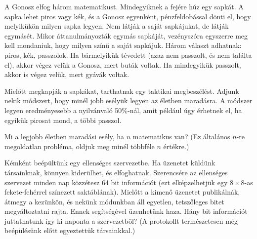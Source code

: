 \begin{Exercise}[counter={sorszam}, difficulty=0]
A Gonosz elfog három matematikust. Mindegyiknek a fejére húz egy sapkát. A sapka lehet piros vagy kék, és a Gonosz egyenként, pénzfeldobással dönti el, hogy melyikükön milyen sapka legyen. Nem látják a saját sapkájukat, de látják egymásét. Mikor áttanulmányozták egymás sapkáját, vezényszóra egyszerre meg kell mondaniuk, hogy milyen színű a saját sapkájuk. Három választ adhatnak: piros, kék, passzolok. Ha bármelyikük tévedett (azaz nem passzolt, és nem találta el), akkor végez velük a Gonosz, mert buták voltak. Ha mindegyikük passzolt, akkor is végez velük, mert gyávák voltak.

Mielőtt megkapják a sapkákat, tarthatnak egy taktikai megbeszélést. Adjunk nekik módszert, hogy minél jobb esélyük legyen az életben maradásra. A módszer legyen eredményesebb a nyilvánvaló 50\%-nál, amit például úgy érhetnek el, ha egyikük pirosat mond, a többi passzol.

Mi a legjobb életben maradási esély, ha $n$ matematikus van? (Ez általános $n$-re megoldatlan probléma, oldjuk meg minél többféle $n$ értékre.)

\end{Exercise}


\begin{Exercise}[counter={sorszam}, difficulty=0]
Kémként beépültünk egy ellenséges szervezetbe. Ha üzenetet küldünk társainknak, könnyen kiderülhet, és elfoghatnak. Szerencsére az ellenséges szervezet minden nap közzétesz 64 bit információt (ezt elképzelhetjük egy $8 \times 8$-as fekete-fehérrel színezett saktáblának). Mielőtt a kimenő üzenetet publikálnák, átmegy a kezünkön, és nekünk módunkban áll egyetlen, tetszőleges bitet megváltoztatni rajta. Ennek segítségével üzenhetünk haza. Hány bit információt juttathatunk így ki naponta a szervezetből? (A protokollt természetesen még beépülésünk előtt egyeztettük társainkkal.)
\end{Exercise}


